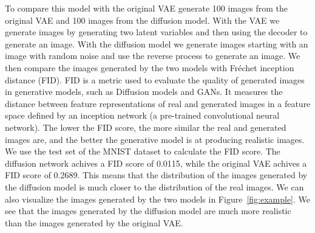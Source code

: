 To compare this model with the original VAE generate 100 images from the original VAE and 100 images from the diffusion model. With the VAE we generate images by generating two latent variables and then using the decoder to generate an image. With the diffusion model we generate images starting with an image with random noise and use the reverse process to generate an image. We then compare the images generated by the two models with Fréchet inception distance (FID). FID is a metric used to evaluate the quality of generated images in generative models, such as Diffusion models and GANs. It measures the distance between feature representations of real and generated images in a feature space defined by an inception network (a pre-trained convolutional neural network). The lower the FID score, the more similar the real and generated images are, and the better the generative model is at producing realistic images. We use the test set of the MNIST dataset to calculate the FID score. The diffusion network achives a FID score of 0.0115, while the original VAE achives a FID score of 0.2689. This means that the distribution of the images generated by the diffusion model is much closer to the distribution of the real images. We can also visualize the images generated by the two models in Figure~\ref{fig:example}. We see that the images generated by the diffusion model are much more realistic than the images generated by the original VAE.